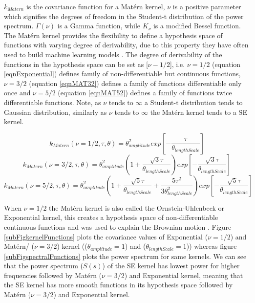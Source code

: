 $k_{Matern}$ is the covariance function for a Mat\'ern kernel, $\nu$ is a positive parameter which signifies the degrees of freedom in the Student-t distribution of the power spectrum. $\Gamma (\nu)$ is a Gamma function, while $K_{\nu}$ is a modified Bessel function. The Mat\'ern kernel provides the flexibility to define a hypothesis space of functions with varying degree of derivability, due to this property they have often used to build machine learning models \cite{minasny2005matern, cornford2002modelling}. The degree of derivability of the functions in the hypothesis space can be set as [$\nu-1/2$], i.e.  $\nu = 1/2$ (equation \ref{eqnExponential}) defines family of non-differentiable but continuous functions, $\nu = 3/2$ (equation \ref{eqnMAT32}) defines a family of functions differentiable only once and $\nu = 5/2$ (equation \ref{eqnMAT52}) defines a family of functions twice differentiable functions. Note, as $\nu$ tends to $\infty$ a Student-t distribution tends to Gaussian distribution, similarly as $\nu$ tends to $\infty$ the Mat\'ern kernel tends to a SE kernel. 

\begin{equation}\label{eqnExponential}
k_{Matern}(\nu = 1/2, \tau, \theta) = \theta_{amplitude}^2exp[-\frac{\tau}{\theta_{lengthScale}}]
\end{equation}
\begin{equation}\label{eqnMAT32}
k_{Matern}(\nu = 3/2, \tau, \theta) = \theta_{amplitude}^2 (1 + \frac{\sqrt{3}\tau}{\theta_{lengthScale}}) exp[-\frac{\sqrt{3}\tau}{\theta_{lengthScale}}]
\end{equation}
\begin{equation}\label{eqnMAT52}
k_{Matern}(\nu = 5/2, \tau, \theta) = \theta_{amplitude}^2(1 + \frac{\sqrt{5}\tau}{\theta_{lengthScale}} + \frac{5\tau^2}{3\theta_{lengthScale}^2})
exp[-\frac{\sqrt{5}\tau}{\theta_{lengthScale}}]
\end{equation}

When $\nu = 1/2$ the Mat\'ern kernel is also called the Ornstein-Uhlenbeck or Exponential kernel, this creates a hypothesis space of non-differentiable continuous functions and was used to explain the Brownian motion \cite{uhlenbeck1930theory}. Figure \ref{subFigkernelFunctions} plots the covariance values of Exponential ($\nu=1/2$) and Mat\'ern/ ($\nu=3/2$) kernel (($\theta_{amplitude} = 1$) and ($\theta_{lengthScale} = 1$)) whereas figure \ref{subFigspectralFunctions} plots the power spectrum for same kernels. We can see that the power spectrum ($S(s)$) of the SE kernel has lowest power for higher frequencies followed by Mat\'ern ($\nu=3/2$) and Exponential kernel, meaning that the SE kernel has more smooth functions in its hypothesis space followed by Mat\'ern ($\nu=3/2$) and Exponential kernel. 

